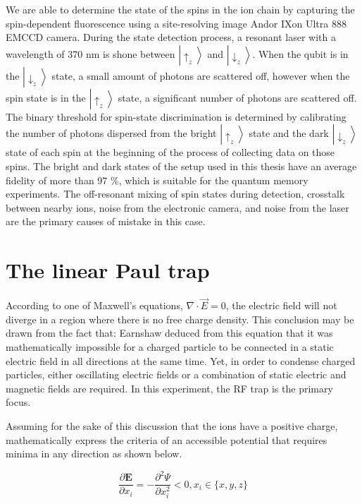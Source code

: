 We are able to determine the state of the spins in the ion chain by capturing the spin-dependent fluorescence using a site-resolving image Andor IXon Ultra 888 EMCCD camera. During the state detection process, a resonant laser with a wavelength of 370 nm is shone between $\left|\uparrow_z\right\rangle$ and $\left|\downarrow_z\right\rangle$. When the qubit is in the $\left|\downarrow_z\right\rangle$ state, a small amount of photons are scattered off, however when the spin state is in the $\left|\uparrow_z\right\rangle$ state, a significant number of photons are scattered off. The binary threshold for spin-state discrimination is determined by calibrating the number of photons dispersed from the bright $\left|\uparrow_z\right\rangle$ state and the dark $\left|\downarrow_z\right\rangle$ state of each spin at the beginning of the process of collecting data on those spins. The bright and dark states of the setup used in this thesis have an average fidelity of more than 97 \%, which is suitable for the quantum memory experiments. The off-resonant mixing of spin states during detection, crosstalk between nearby ions, noise from the electronic camera, and noise from the laser are the primary causes of mistake in this case.


\section{The linear Paul trap}

According to one of Maxwell's equations, $\nabla \cdot \vec{E}=0$, the electric field will not diverge in a region where there is no free charge density. This conclusion may be drawn from the fact that: Earnshaw deduced from this equation that it was mathematically impossible for a charged particle to be connected in a static electric field in all directions at the same time. Yet, in order to condense charged particles, either oscillating electric fields or a combination of static electric and magnetic fields are required. In this experiment, the RF trap is the primary focus.

Assuming for the sake of this discussion that the ions have a positive charge, mathematically express the criteria of an accessible potential that requires minima in any direction as shown below.

\begin{equation}\label{eq:minima}
    \frac{\partial \mathbf{E}}{\partial x_i}=-\frac{\partial^2 \Psi}{\partial x_i^2}<0, x_i \in\{x, y, z\}
\end{equation}


